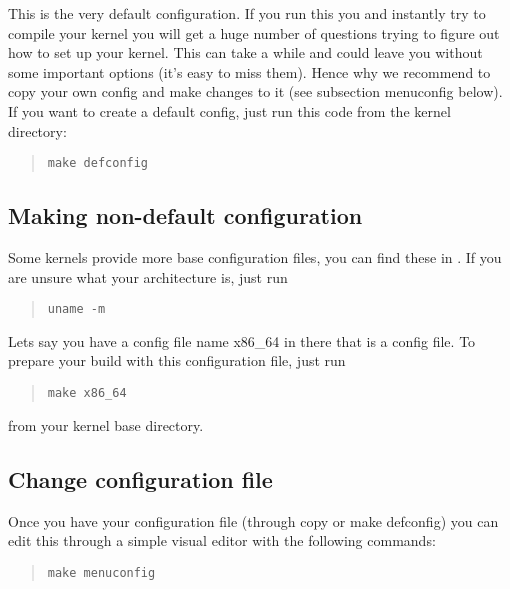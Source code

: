 This is the very default configuration. If you run this you and instantly try to compile your kernel you will get a huge number of questions trying to figure out how to set up your kernel. This can take a while and could leave you without some important options (it's easy to miss them). Hence why we recommend to copy your own config and make changes to it (see subsection menuconfig below). If you want to create a default config, just run this code from the kernel directory:

\begin{quote} \begin{verbatim}make defconfig \end{verbatim} \end{quote}

\subsection*{Making non-default configuration}

Some kernels provide more base configuration files, you can find these in . If you are unsure what your architecture is, just run

\begin{quote} \begin{verbatim}uname -m \end{verbatim} \end{quote}

Lets say you have a config file name x86\_64 in there that is a config file. To prepare your build with this configuration file, just run 

\begin{quote} \begin{verbatim}make x86_64 \end{verbatim} \end{quote}

from your kernel base directory.

\subsection*{Change configuration file}

Once you have your configuration file (through copy or make defconfig) you can edit this through a simple visual editor with the following commands:

\begin{quote} \begin{verbatim}make menuconfig \end{verbatim} \end{quote}

